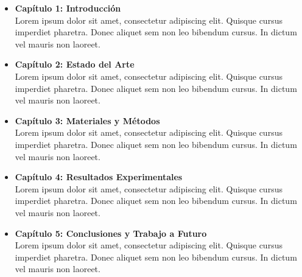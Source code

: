     \begin{itemize}
      \item \textbf{Capítulo 1: Introducción} \\

      Lorem ipsum dolor sit amet, consectetur adipiscing elit. Quisque cursus imperdiet
      pharetra. Donec aliquet sem non leo bibendum cursus. In dictum vel mauris non
      laoreet.

      \item \textbf{Capítulo 2: Estado del Arte} \\

      Lorem ipsum dolor sit amet, consectetur adipiscing elit. Quisque cursus imperdiet
      pharetra. Donec aliquet sem non leo bibendum cursus. In dictum vel mauris non
      laoreet.

      \item \textbf{Capítulo 3: Materiales y Métodos} \\

      Lorem ipsum dolor sit amet, consectetur adipiscing elit. Quisque cursus imperdiet
      pharetra. Donec aliquet sem non leo bibendum cursus. In dictum vel mauris non
      laoreet.

      \item \textbf{Capítulo 4: Resultados Experimentales} \\

      Lorem ipsum dolor sit amet, consectetur adipiscing elit. Quisque cursus imperdiet
      pharetra. Donec aliquet sem non leo bibendum cursus. In dictum vel mauris non
      laoreet.

      \item \textbf{Capítulo 5: Conclusiones y Trabajo a Futuro} \\

      Lorem ipsum dolor sit amet, consectetur adipiscing elit. Quisque cursus imperdiet
      pharetra. Donec aliquet sem non leo bibendum cursus. In dictum vel mauris non
      laoreet.

    \end{itemize}
